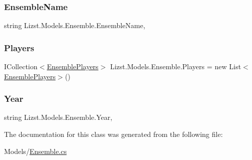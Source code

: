 \mbox{\label{class_lizst_1_1_models_1_1_ensemble_a87bb4aabfbdec64b7bb1b684e25ce3d5}} 
\subsubsection{\texorpdfstring{EnsembleName}{EnsembleName}}
{\footnotesize\ttfamily string Lizst.\+Models.\+Ensemble.\+Ensemble\+Name\hspace{0.3cm}{\ttfamily [get]}, {\ttfamily [set]}}

\mbox{\label{class_lizst_1_1_models_1_1_ensemble_a261f4424029a9a3219471268394ca579}} 
\subsubsection{\texorpdfstring{Players}{Players}}
{\footnotesize\ttfamily I\+Collection$<$\mbox{\hyperlink{class_lizst_1_1_models_1_1_ensemble_players}{Ensemble\+Players}}$>$ Lizst.\+Models.\+Ensemble.\+Players = new List$<$\mbox{\hyperlink{class_lizst_1_1_models_1_1_ensemble_players}{Ensemble\+Players}}$>$()\hspace{0.3cm}{\ttfamily [get]}}

\mbox{\label{class_lizst_1_1_models_1_1_ensemble_a77a9bfd6009a86301ee4ff1d42435462}} 
\subsubsection{\texorpdfstring{Year}{Year}}
{\footnotesize\ttfamily string Lizst.\+Models.\+Ensemble.\+Year\hspace{0.3cm}{\ttfamily [get]}, {\ttfamily [set]}}



The documentation for this class was generated from the following file\+:\begin{DoxyCompactItemize}
\item 
Models/\mbox{\hyperlink{_ensemble_8cs}{Ensemble.\+cs}}\end{DoxyCompactItemize}
